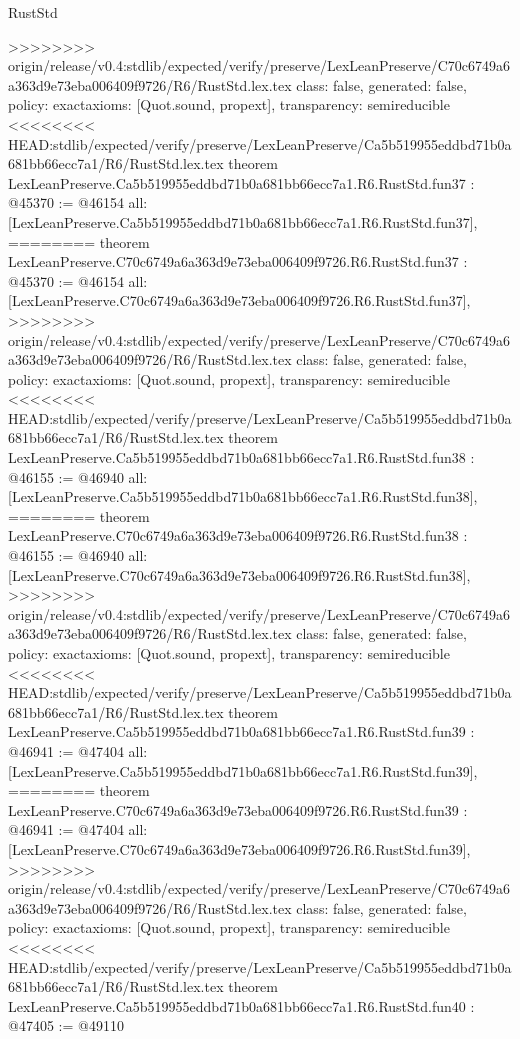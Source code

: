 \begin{lexlean}{RustStd}
\begin{coremodule}
{\begin{coremodule}
{{{{{{{{{{{{{{{{{{{{{{{{{{{{{{{{{{{{{{{{>>>>>>>> origin/release/v0.4:stdlib/expected/verify/preserve/LexLeanPreserve/C70c6749a6a363d9e73eba006409f9726/R6/RustStd.lex.tex
  class: false,
  generated: false,
  policy: exact{axioms: [Quot.sound, propext]},
  transparency: semireducible
}
<<<<<<<< HEAD:stdlib/expected/verify/preserve/LexLeanPreserve/Ca5b519955eddbd71b0a681bb66ecc7a1/R6/RustStd.lex.tex
theorem LexLeanPreserve.Ca5b519955eddbd71b0a681bb66ecc7a1.R6.RustStd.fun37 : @45370 := @46154 {
  all: [LexLeanPreserve.Ca5b519955eddbd71b0a681bb66ecc7a1.R6.RustStd.fun37],
========
theorem LexLeanPreserve.C70c6749a6a363d9e73eba006409f9726.R6.RustStd.fun37 : @45370 := @46154 {
  all: [LexLeanPreserve.C70c6749a6a363d9e73eba006409f9726.R6.RustStd.fun37],
>>>>>>>> origin/release/v0.4:stdlib/expected/verify/preserve/LexLeanPreserve/C70c6749a6a363d9e73eba006409f9726/R6/RustStd.lex.tex
  class: false,
  generated: false,
  policy: exact{axioms: [Quot.sound, propext]},
  transparency: semireducible
}
<<<<<<<< HEAD:stdlib/expected/verify/preserve/LexLeanPreserve/Ca5b519955eddbd71b0a681bb66ecc7a1/R6/RustStd.lex.tex
theorem LexLeanPreserve.Ca5b519955eddbd71b0a681bb66ecc7a1.R6.RustStd.fun38 : @46155 := @46940 {
  all: [LexLeanPreserve.Ca5b519955eddbd71b0a681bb66ecc7a1.R6.RustStd.fun38],
========
theorem LexLeanPreserve.C70c6749a6a363d9e73eba006409f9726.R6.RustStd.fun38 : @46155 := @46940 {
  all: [LexLeanPreserve.C70c6749a6a363d9e73eba006409f9726.R6.RustStd.fun38],
>>>>>>>> origin/release/v0.4:stdlib/expected/verify/preserve/LexLeanPreserve/C70c6749a6a363d9e73eba006409f9726/R6/RustStd.lex.tex
  class: false,
  generated: false,
  policy: exact{axioms: [Quot.sound, propext]},
  transparency: semireducible
}
<<<<<<<< HEAD:stdlib/expected/verify/preserve/LexLeanPreserve/Ca5b519955eddbd71b0a681bb66ecc7a1/R6/RustStd.lex.tex
theorem LexLeanPreserve.Ca5b519955eddbd71b0a681bb66ecc7a1.R6.RustStd.fun39 : @46941 := @47404 {
  all: [LexLeanPreserve.Ca5b519955eddbd71b0a681bb66ecc7a1.R6.RustStd.fun39],
========
theorem LexLeanPreserve.C70c6749a6a363d9e73eba006409f9726.R6.RustStd.fun39 : @46941 := @47404 {
  all: [LexLeanPreserve.C70c6749a6a363d9e73eba006409f9726.R6.RustStd.fun39],
>>>>>>>> origin/release/v0.4:stdlib/expected/verify/preserve/LexLeanPreserve/C70c6749a6a363d9e73eba006409f9726/R6/RustStd.lex.tex
  class: false,
  generated: false,
  policy: exact{axioms: [Quot.sound, propext]},
  transparency: semireducible
}
<<<<<<<< HEAD:stdlib/expected/verify/preserve/LexLeanPreserve/Ca5b519955eddbd71b0a681bb66ecc7a1/R6/RustStd.lex.tex
theorem LexLeanPreserve.Ca5b519955eddbd71b0a681bb66ecc7a1.R6.RustStd.fun40 : @47405 := @49110 {
}}}}}}}}}}}}}}}}}}}}}}}}}}}}}}}}}}}}}}}}}}}
\end{coremodule}}
\end{coremodule}
\end{lexlean}
